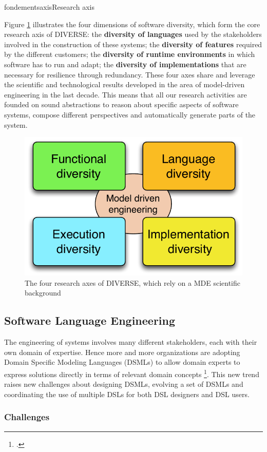 \documentclass{ra2018}
\newcommand{\team}{DIVERSE}
\begin{document}
\begin{module}{fondements}{axis}{Research axis}
\label{sec:axis}

Figure \ref{fig:axis} illustrates the four dimensions of software diversity, which form the core research axis of \team{}: the \textbf{diversity of languages} used by the stakeholders involved in the construction of these systems; the \textbf{diversity of features} required by the different customers; the \textbf{diversity of runtime environments} in which software has to run and adapt; the \textbf{diversity of implementations} that are necessary for resilience through redundancy. 
These four axes share and leverage the scientific and technological results developed in the area of model-driven engineering in the last decade. 
This means that all our research activities are founded on sound abstractions to reason about specific aspects of software systems, compose different perspectives and automatically generate parts of the system.

\begin{figure}
\centering
\includegraphics[width=0.5\columnwidth]{IMG/research-axis.pdf}
\caption{The four research axes of \team{}, which rely on a MDE scientific background}
\label{fig:axis}
\end{figure}

\subsection{Software Language Engineering}
\label{sec:axis-sle}

The engineering of systems involves many different stakeholders, each with their own domain of expertise. Hence more and more organizations are adopting Domain Specific Modeling Languages (DSMLs) to allow domain experts to express solutions directly in terms of relevant domain concepts   \footcite{Schmidt06,France07}. This new trend raises new challenges about designing DSMLs, evolving a set of DSMLs and coordinating the use of multiple DSLs for both DSL designers and DSL users.


\subsubsection*{Challenges} 


\end{module}
\end{document}
